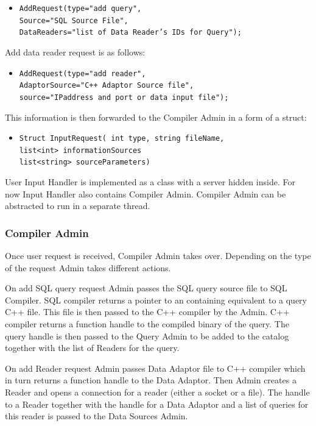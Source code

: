 \documentclass[14pt]{article}
\begin{document}
\begin{itemize}
	\item {\tt AddRequest(type="add query",\\
		 Source="SQL Source File",\\
	     DataReaders="list of Data Reader's IDs for Query");}
\end{itemize}

\noindent Add data reader request is as follows:

\begin{itemize}
	\item {\tt AddRequest(type="add reader", \\
	     AdaptorSource="C++ Adaptor Source file",\\
	     source="IPaddress and port or data input file");}
\end{itemize}

This information is then forwarded to the Compiler Admin in a form of a struct:

\begin{itemize}
	\item {\tt Struct InputRequest( int type, string fileName,\\
	       list<int> informationSources \\
		   list<string> sourceParameters)}
\end{itemize}

User Input Handler is implemented as a class with a server hidden inside. For now Input Handler also contains Compiler Admin. Compiler Admin can be abstracted to run in a separate thread. 

\subsubsection{Compiler Admin}

Once user request is received, Compiler Admin takes over. Depending on the type of the request Admin takes different actions. 

On add SQL query request Admin passes the SQL query source file to SQL Compiler. SQL compiler returns a pointer to an containing equivalent to a query C++ file. This file is then passed to the C++ compiler by the Admin. C++ compiler returns a function handle to the compiled binary of the query. The query handle is then passed to the Query Admin to be added to the catalog together with the list of Readers for the query.

On add Reader request Admin passes Data Adaptor file to C++ compiler which in turn returns a function handle to the Data Adaptor. Then Admin creates a Reader and opens a connection for a reader (either a socket or a file). The handle to a Reader together with the handle for a Data Adaptor and a list of queries for this reader is passed to the Data Sources Admin. 
\end{document}
